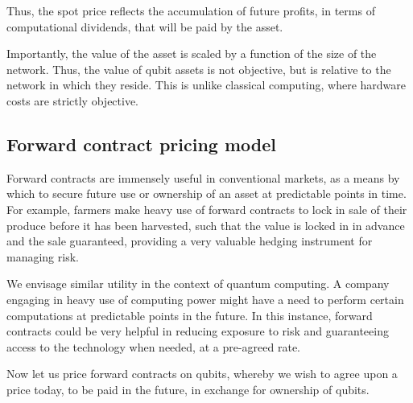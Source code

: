 Thus, the spot price reflects the accumulation of future profits, in terms of computational dividends, that will be paid by the asset.

Importantly, the value of the asset is scaled by a function of the size of the network. Thus, the value of qubit assets is not objective, but is relative to the network in which they reside. This is unlike classical computing, where hardware costs are strictly objective.


%
%

\subsection{Forward contract pricing model}\label{sec:for_contr}


Forward contracts are immensely useful in conventional markets, as a means by which to secure future use or ownership of an asset at predictable points in time. For example, farmers make heavy use of forward contracts to lock in sale of their produce before it has been harvested, such that the value is locked in in advance and the sale guaranteed, providing a very valuable hedging instrument for managing risk.

We envisage similar utility in the context of quantum computing. A company engaging in heavy use of computing power might have a need to perform certain computations at predictable points in the future. In this instance, forward contracts could be very helpful in reducing exposure to risk and guaranteeing access to the technology when needed, at a pre-agreed rate.

Now let us price forward contracts on qubits, whereby we wish to agree upon a price today, to be paid in the future, in exchange for ownership of qubits.


